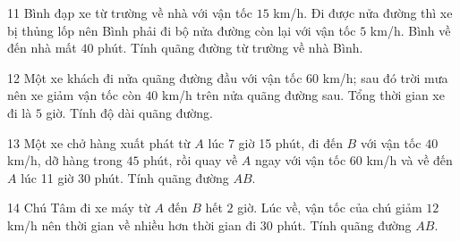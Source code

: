 \gap
\begin{probbox}{11}{\relax}
Bình đạp xe từ trường về nhà với vận tốc $15$ km/h. Đi được nửa đường thì xe bị thủng lốp nên Bình phải đi bộ nửa đường còn lại với vận tốc $5$ km/h. Bình về đến nhà mất $40$ phút. Tính quãng đường từ trường về nhà Bình.
\end{probbox}
\gap
\begin{probbox}{12}{\relax}
Một xe khách đi nửa quãng đường đầu với vận tốc $60$ km/h; sau đó trời mưa nên xe giảm vận tốc còn $40$ km/h trên nửa quãng đường sau. Tổng thời gian xe đi là $5$ giờ. Tính độ dài quãng đường.
\end{probbox}
\gap
\begin{probbox}{13}{\relax}
Một xe chở hàng xuất phát từ $A$ lúc 7 giờ 15 phút, đi đến $B$ với vận tốc $40$ km/h, dỡ hàng trong $45$ phút, rồi quay về $A$ ngay với vận tốc $60$ km/h và về đến $A$ lúc 11 giờ 30 phút. Tính quãng đường $AB$.
\end{probbox}
\gap
\begin{probbox}{14}{\relax}
Chú Tâm đi xe máy từ $A$ đến $B$ hết $2$ giờ. Lúc về, vận tốc của chú giảm $12$ km/h nên thời gian về nhiều hơn thời gian đi $30$ phút. Tính quãng đường $AB$.
\end{probbox}
